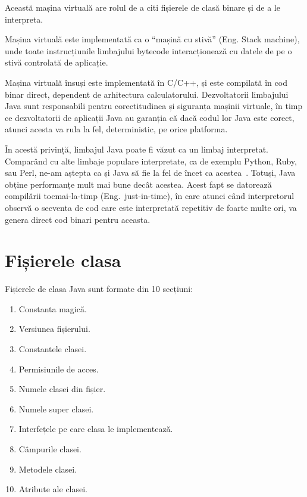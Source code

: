 Această mașina virtuală are rolul de a citi fișierele de clasă binare și
de a le interpreta.

Mașina virtuală este implementată ca o ``mașină cu stivă'' (Eng. Stack
machine), unde toate instrucțiunile limbajului bytecode interacționează
cu datele de pe o stivă controlată de aplicație.

Mașina virtuală însuși este implementată în C/C++, și este compilată în
cod binar direct, dependent de arhitectura calculatorului. Dezvoltatorii limbajului
Java sunt responsabili pentru corectitudinea și siguranța mașinii
virtuale, în timp ce dezvoltatorii de aplicații Java au garanția că dacă
codul lor Java este corect, atunci acesta va rula la fel, deterministic,
pe orice platforma.

În acestă privință, limbajul Java poate fi văzut ca un limbaj interpretat.
Comparând cu alte limbaje populare interpretate, ca de exemplu Python,
Ruby, sau Perl, ne-am aștepta ca și Java să fie la fel de încet ca
acestea~\cite{language_benchmarks}.
Totuși, Java obține performanțe mult mai bune decât
acestea. Acest fapt se datorează compilării tocmai-la-timp (Eng.\
just-in-time), în care atunci când interpretorul observă o secventa de
cod care este interpretată repetitiv de foarte multe ori, va genera
direct cod binari pentru aceasta.


\section{Fișierele clasa}

Fișierele de clasa Java sunt formate din 10
secțiuni\cite{classfile_sections}:

\begin{enumerate}
	\item
	      Constanta magică.
	\item
	      Versiunea fișierului.
	\item
	      Constantele clasei.
	\item
	      Permisiunile de acces.
	\item
	      Numele clasei din fișier.
	\item
	      Numele super clasei.
	\item
	      Interfețele pe care clasa le implementează.
	\item
	      Câmpurile clasei.
	\item
	      Metodele clasei.
	\item
	      Atribute ale clasei.
\end{enumerate}

